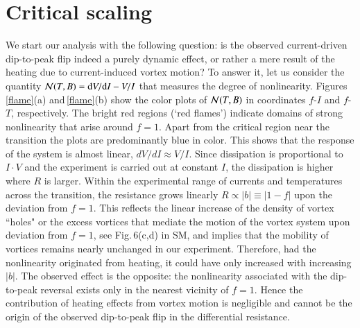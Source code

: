 \documentclass[aps,twocolumn,prl,10pt,amsmath,amssymb,nofootinbib,showpacs,superscriptaddress,floatfix]{revtex4-1}
\begin{document}
\section*{Critical scaling}
We start our analysis with the following question: is the observed current-driven dip-to-peak flip indeed a purely dynamic effect, or rather a mere result of the heating due to current-induced vortex motion? 
To answer it, let us consider the quantity ${\cal N}(T,B)=\mathrm{d}V/\mathrm{d}I-V/I$ that measures the degree of nonlinearity.
Figures\,\ref{flame}(a) and\,\ref{flame}(b) show the color plots of ${\cal N}(T,B)$ in coordinates $f$-$I$ and $f$-$T$, respectively.
The bright red regions (`red flames') indicate domains of strong nonlinearity that arise around $f=1$. 
Apart from the critical region near the transition the plots are predominantly blue in color. This shows that the response of the system is almost linear, $dV/dI\approx V/I$.
Since dissipation is proportional to $I\cdot V$ and the experiment is carried out at constant $I$, the dissipation is higher where $R$ is larger. Within the experimental range of currents and temperatures across the transition, the resistance grows linearly $R\propto|b|\equiv|1-f|$ upon the deviation from $f=1$. This reflects the linear increase of the
density of vortex ``holes" or the excess vortices that mediate the motion of the vortex system upon deviation from $f=1$, 
see Fig.\,6(c,d) in SM, and implies that the mobility of vortices remains nearly unchanged in our experiment. Therefore, had the nonlinearity originated from heating,
it could have only increased with increasing $|b|$. The observed effect is the opposite: the nonlinearity associated with the dip-to-peak reversal exists only in the nearest vicinity of $f=1$. 
Hence the contribution of heating effects from vortex motion is negligible 
and cannot be the origin of the observed 
dip-to-peak flip in the differential resistance.
\end{document}
